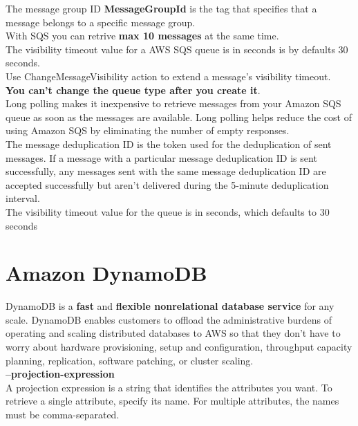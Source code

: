 \documentclass[12pt, letterpaper, twoside]{article}
\begin{document}
The message group ID \textbf{MessageGroupId} is the tag that specifies that a message belongs to a specific message group.\\

With SQS you can retrive \textbf{max 10 messages} at the same time.\\

The visibility timeout value for a AWS SQS queue is in seconds is by defaults 30 seconds.\\
Use ChangeMessageVisibility action to extend a message's visibility timeout.\\

\textbf{You can't change the queue type after you create it}.\\

Long polling makes it inexpensive to retrieve messages from your Amazon SQS queue as soon as the messages are available. 
Long polling helps reduce the cost of using Amazon SQS by eliminating the number of empty responses.\\

The message deduplication ID is the token used for the deduplication of sent messages. If a message with a particular message 
deduplication ID is sent successfully, any messages sent with the same message deduplication ID are accepted successfully but 
aren't delivered during the 5-minute deduplication interval.\\

The visibility timeout value for the queue is in seconds, which defaults to 30 seconds\\

\section{Amazon DynamoDB}
DynamoDB is a \textbf{fast} and \textbf{flexible nonrelational database service }for any scale. DynamoDB enables customers 
to offload the administrative burdens of operating and scaling distributed databases to AWS so that they don’t have to worry 
about hardware provisioning, setup and configuration, throughput capacity planning, replication, software patching, or 
cluster scaling.\\

\textbf{--projection-expression}\\
A projection expression is a string that identifies the attributes you want. To retrieve a single attribute, specify its name. 
For multiple attributes, the names must be comma-separated.
\end{document}

